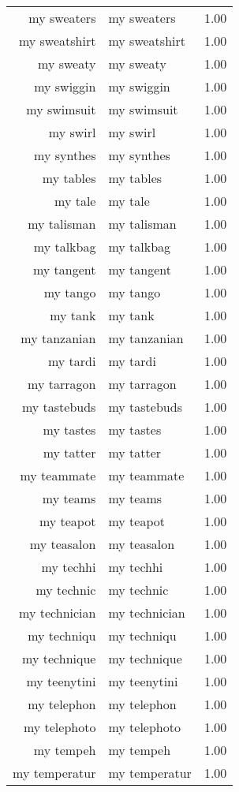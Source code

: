 \begin{table}[ht]
\begin{tabular}{rlr}
  my sweaters & my sweaters & 1.00 \\ 
  my sweatshirt & my sweatshirt & 1.00 \\ 
  my sweaty & my sweaty & 1.00 \\ 
  my swiggin & my swiggin & 1.00 \\ 
  my swimsuit & my swimsuit & 1.00 \\ 
  my swirl & my swirl & 1.00 \\ 
  my synthes & my synthes & 1.00 \\ 
  my tables & my tables & 1.00 \\ 
  my tale & my tale & 1.00 \\ 
  my talisman & my talisman & 1.00 \\ 
  my talkbag & my talkbag & 1.00 \\ 
  my tangent & my tangent & 1.00 \\ 
  my tango & my tango & 1.00 \\ 
  my tank & my tank & 1.00 \\ 
  my tanzanian & my tanzanian & 1.00 \\ 
  my tardi & my tardi & 1.00 \\ 
  my tarragon & my tarragon & 1.00 \\ 
  my tastebuds & my tastebuds & 1.00 \\ 
  my tastes & my tastes & 1.00 \\ 
  my tatter & my tatter & 1.00 \\ 
  my teammate & my teammate & 1.00 \\ 
  my teams & my teams & 1.00 \\ 
  my teapot & my teapot & 1.00 \\ 
  my teasalon & my teasalon & 1.00 \\ 
  my techhi & my techhi & 1.00 \\ 
  my technic & my technic & 1.00 \\ 
  my technician & my technician & 1.00 \\ 
  my techniqu & my techniqu & 1.00 \\ 
  my technique & my technique & 1.00 \\ 
  my teenytini & my teenytini & 1.00 \\ 
  my telephon & my telephon & 1.00 \\ 
  my telephoto & my telephoto & 1.00 \\ 
  my tempeh & my tempeh & 1.00 \\ 
  my temperatur & my temperatur & 1.00 \\ 

\end{tabular}
\end{table}
